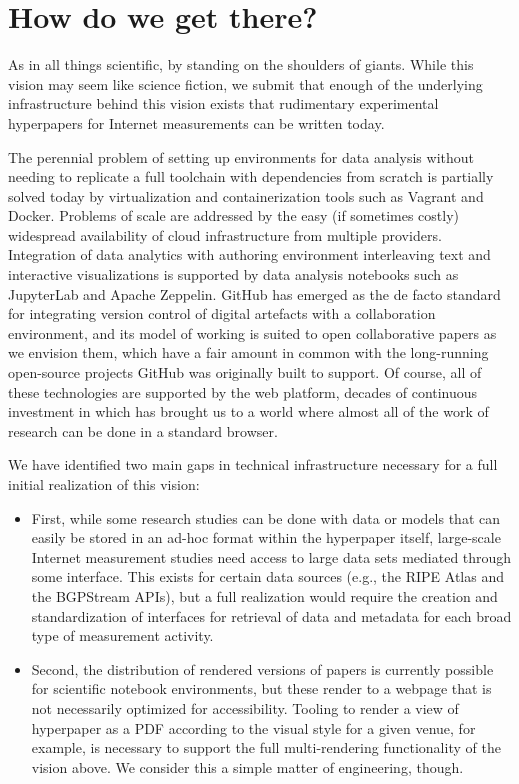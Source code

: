\documentclass[sigconf,10pt]{acmart}
\begin{document}
\section{How do we get there?}
\label{sec:how}

As in all things scientific, by standing on the shoulders of giants. While this
vision may seem like science fiction, we submit that enough of the underlying
infrastructure behind this vision exists that rudimentary experimental
hyperpapers for Internet measurements can be written today.

The perennial problem of setting up environments for data analysis without
needing to replicate a full toolchain with dependencies from scratch is
partially solved today by virtualization and containerization tools such as
Vagrant and Docker. Problems of scale are addressed by the easy (if sometimes
costly) widespread availability of cloud infrastructure from multiple
providers.  Integration of data analytics with authoring environment
interleaving text and interactive visualizations is supported by data analysis
notebooks such as JupyterLab and Apache Zeppelin. GitHub has emerged as the de
facto standard for integrating version control of digital artefacts with a
collaboration environment, and its model of working is suited to open
collaborative papers as we envision them, which have a fair amount in common
with the long-running open-source projects GitHub was originally built to
support. Of course, all of these technologies are supported by the web
platform, decades of continuous investment in which has brought us to a world
where almost all of the work of research can be done in a standard browser.

We have identified two main gaps in technical infrastructure necessary for a
full initial realization of this vision:

\begin{itemize}
	
	\item First, while some research studies can be done with data or models
that can easily be stored in an ad-hoc format within the hyperpaper itself,
large-scale Internet measurement studies need access to large data sets mediated
through some interface. This exists for certain data sources (e.g., the RIPE
Atlas and the BGPStream APIs), but a full realization would require the creation
and standardization of interfaces for retrieval of data and metadata for each
broad type of measurement activity.

	\item Second, the distribution of rendered versions of papers is currently
	possible for scientific notebook environments, but these render to a webpage
	that is not necessarily optimized for accessibility. Tooling to render a
	view of hyperpaper as a PDF according to the visual style for a given venue,
	for example, is necessary to support the full multi-rendering functionality
	of the vision above. We consider this a simple matter of engineering,
	though.

\end{itemize}
\end{document}
